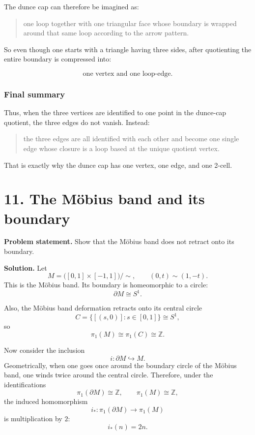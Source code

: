 \documentclass[12pt,a4paper]{article}
\theoremstyle{notespace}
\begin{document}
The dunce cap can therefore be imagined as:

\begin{quote}
	one loop together with one triangular face whose boundary is wrapped around that same loop according to the arrow pattern.
\end{quote}

So even though one starts with a triangle having three sides, after quotienting the entire boundary is compressed into:

\[
\text{one vertex and one loop-edge}.
\]

\subsubsection{Final summary}

Thus, when the three vertices are identified to one point in the dunce-cap quotient, the three edges do not vanish. Instead:

\begin{quote}
	the three edges are all identified with each other and become one single edge whose closure is a loop based at the unique quotient vertex.
\end{quote}

That is exactly why the dunce cap has one vertex, one edge, and one 2-cell.
\section{11. The Möbius band and its boundary}

\textbf{Problem statement.} Show that the Möbius band does not retract onto its boundary.

\textbf{Solution.}
Let
\[
M=\bigl([0,1]\times[-1,1]\bigr)/\sim,
\qquad
(0,t)\sim(1,-t).
\]
This is the Möbius band. Its boundary is homeomorphic to a circle:
\[
\partial M \cong S^1.
\]

Also, the Möbius band deformation retracts onto its central circle
\[
C=\{[(s,0)] : s\in[0,1]\}\cong S^1,
\]
so
\[
\pi_1(M)\cong \pi_1(C)\cong \mathbb Z.
\]

Now consider the inclusion
\[
i:\partial M\hookrightarrow M.
\]
Geometrically, when one goes once around the boundary circle of the Möbius band, one winds twice around the central circle. Therefore, under the identifications
\[
\pi_1(\partial M)\cong \mathbb Z,
\qquad
\pi_1(M)\cong \mathbb Z,
\]
the induced homomorphism
\[
i_*:\pi_1(\partial M)\to \pi_1(M)
\]
is multiplication by \(2\):
\[
i_*(n)=2n.
\]
\end{document}
